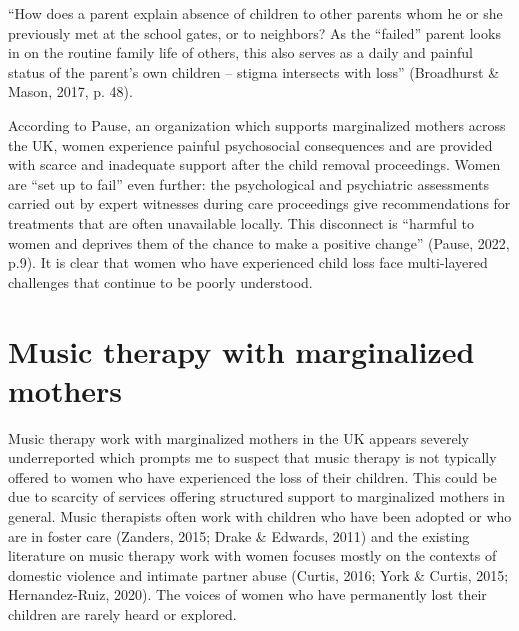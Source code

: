 \documentclass[authordate, empirical, issue]{jote-new-article}
\begin{document}
“How does a parent explain absence of children to other parents whom he or she previously met at the school gates, or to neighbors? As the “failed” parent looks in on the routine family life of others, this also serves as a daily and painful status of the parent's own children -- stigma intersects with loss” (Broadhurst \& Mason, 2017, p. 48).







According to Pause, an organization which supports marginalized mothers across the UK, women experience painful psychosocial consequences and are provided with scarce and inadequate support after the child removal proceedings. Women are “set up to fail” even further: the psychological and psychiatric assessments carried out by expert witnesses during care proceedings give recommendations for treatments that are often unavailable locally. This disconnect is “harmful to women and deprives them of the chance to make a positive change” (Pause, 2022, p.9). It is clear that women who have experienced child loss face multi-layered challenges that continue to be poorly understood.







\section{Music therapy with marginalized \mbox{mothers}}







Music therapy work with marginalized mothers in the UK appears severely underreported which prompts me to suspect that music therapy is not typically offered to women who have experienced the loss of their children. This could be due to scarcity of services offering structured support to marginalized mothers in general. Music therapists often work with children who have been adopted or who are in foster care (Zanders, 2015; Drake \& Edwards, 2011) and the existing literature on music therapy work with women focuses mostly on the contexts of domestic violence and intimate partner abuse (Curtis, 2016; York \& Curtis, 2015; Hernandez-Ruiz, 2020). The voices of women who have permanently lost their children are rarely heard or explored.
\end{document}
